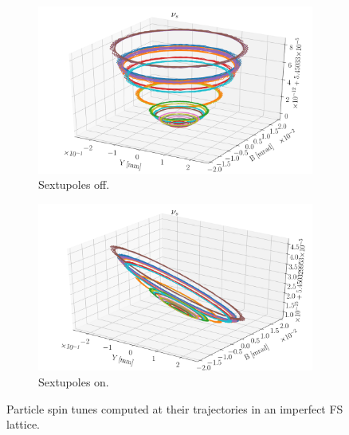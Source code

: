 \begin{figure}[!h]
	\centering
	\begin{subfigure}{\linewidth}
		\includegraphics[width=\linewidth]{images/decoh_sim/ST_VS_YB_IMPERFECT_UNOPT}
		\caption{Sextupoles off.}
	\end{subfigure}
	\begin{subfigure}{\linewidth}
		\includegraphics[width=\linewidth]{images/decoh_sim/ST_VS_YB_IMPERFECT_OPTIM}
		\caption{Sextupoles on.}
	\end{subfigure}
	\caption{Particle spin tunes computed at their trajectories
          in an imperfect FS lattice.\label{decoh:fig:ST_on_traj}}
\end{figure}

